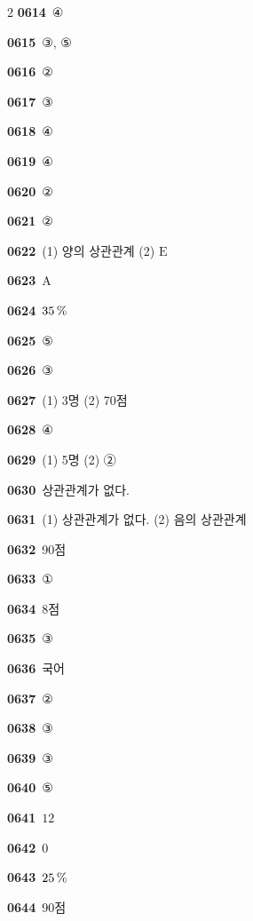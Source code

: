 \documentclass[10pt,a4paper]{article}
\newcommand{\pt}[1]{\mathrm{#1}}
\begin{document}
\begin{multicols}{2}
\noindent\textbf{0614}\ ④\par
\noindent\textbf{0615}\ ③, ⑤\par
\noindent\textbf{0616}\ ②\par
\noindent\textbf{0617}\ ③\par
\noindent\textbf{0618}\ ④\par
\noindent\textbf{0619}\ ④\par
\noindent\textbf{0620}\ ②\par
\noindent\textbf{0621}\ ②\par
\noindent\textbf{0622}\ (1) 양의 상관관계 (2) $\pt{E}$\par
\noindent\textbf{0623}\ $\pt{A}$\par
\noindent\textbf{0624}\ $35\mkern3mu \%$\par
\noindent\textbf{0625}\ ⑤\par
\noindent\textbf{0626}\ ③\par
\noindent\textbf{0627}\ (1) 3명 (2) 70점\par
\noindent\textbf{0628}\ ④\par
\noindent\textbf{0629}\ (1) 5명 (2) ②\par
\noindent\textbf{0630}\ 상관관계가 없다.\par
\noindent\textbf{0631}\ (1) 상관관계가 없다. (2) 음의 상관관계\par
\noindent\textbf{0632}\ 90점\par
\noindent\textbf{0633}\ ①\par
\noindent\textbf{0634}\ 8점\par
\noindent\textbf{0635}\ ③\par
\noindent\textbf{0636}\ 국어\par
\noindent\textbf{0637}\ ②\par
\noindent\textbf{0638}\ ③\par
\noindent\textbf{0639}\ ③\par
\noindent\textbf{0640}\ ⑤\par
\noindent\textbf{0641}\ $12$\par
\noindent\textbf{0642}\ $0$\par
\noindent\textbf{0643}\ $25\mkern3mu \%$\par
\noindent\textbf{0644}\ 90점\par
\end{multicols}
\end{document}
